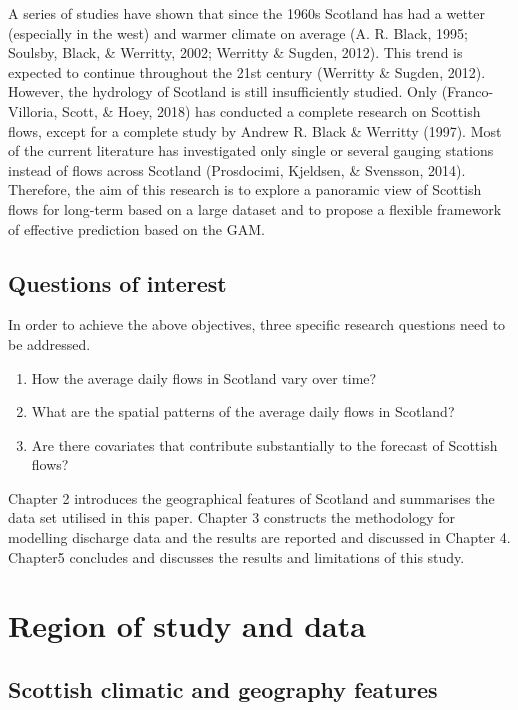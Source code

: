 \documentclass[12pt,oneside]{reedthesis}
\begin{document}
A series of studies have shown that since the 1960s Scotland has had a wetter (especially in the west) and warmer climate on average (A. R. Black, 1995; Soulsby, Black, \& Werritty, 2002; Werritty \& Sugden, 2012). This trend is expected to continue throughout the 21st century (Werritty \& Sugden, 2012). However, the hydrology of Scotland is still insufficiently studied. Only (Franco-Villoria, Scott, \& Hoey, 2018) has conducted a complete research on Scottish flows, except for a complete study by Andrew R. Black \& Werritty (1997). Most of the current literature has investigated only single or several gauging stations instead of flows across Scotland (Prosdocimi, Kjeldsen, \& Svensson, 2014). Therefore, the aim of this research is to explore a panoramic view of Scottish flows for long-term based on a large dataset and to propose a flexible framework of effective prediction based on the GAM.

\hypertarget{questions-of-interest}{%
\section{Questions of interest}\label{questions-of-interest}}

In order to achieve the above objectives, three specific research questions need to be addressed.
\begin{enumerate}
\def\labelenumi{\arabic{enumi}.}
\item
  How the average daily flows in Scotland vary over time?
\item
  What are the spatial patterns of the average daily flows in Scotland?
\item
  Are there covariates that contribute substantially to the forecast of Scottish flows?
\end{enumerate}
Chapter 2 introduces the geographical features of Scotland and summarises the data set utilised in this paper. Chapter 3 constructs the methodology for modelling discharge data and the results are reported and discussed in Chapter 4. Chapter5 concludes and discusses the results and limitations of this study.

\hypertarget{math-sci}{%
\chapter{Region of study and data}\label{math-sci}}

\hypertarget{scottish-climatic-and-geography-features}{%
\section{Scottish climatic and geography features}\label{scottish-climatic-and-geography-features}}
\end{document}
